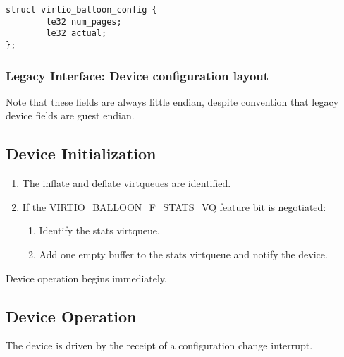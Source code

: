 \begin{lstlisting}
struct virtio_balloon_config {
        le32 num_pages;
        le32 actual;
};
\end{lstlisting}

\subsubsection{Legacy Interface: Device configuration layout}\label{sec:Device Types / Memory Balloon Device / Device configuration layout / Legacy Interface: Device configuration layout}
Note that these fields are always little endian, despite convention
that legacy device fields are guest endian.

\subsection{Device Initialization}\label{sec:Device Types / Memory Balloon Device / Device Initialization}

\begin{enumerate}
\item The inflate and deflate virtqueues are identified.

\item If the VIRTIO_BALLOON_F_STATS_VQ feature bit is negotiated:
  \begin{enumerate}
  \item Identify the stats virtqueue.

  \item Add one empty buffer to the stats virtqueue and notify the
    device.
  \end{enumerate}
\end{enumerate}

Device operation begins immediately.

\subsection{Device Operation}\label{sec:Device Types / Memory Balloon Device / Device Operation}

The device is driven by the receipt of a
configuration change interrupt.

